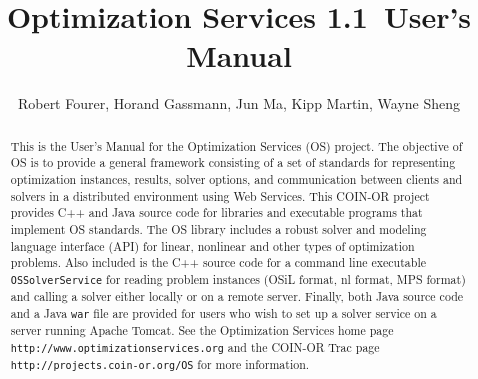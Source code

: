 \documentclass[11pt]{article}
\renewcommand{\_}{{\char"5F}}
\renewcommand{\{}{{\char"7B}}
\renewcommand{\}}{{\char"7D}}
\renewcommand{\^}{{\char"0D}}
\renewcommand{\'}{{\char"0D}}
\newcommand{\UrlOs}{http://www.optimizationservices.org}
\newcommand{\UrlTrac}{http://projects.coin-or.org/OS}
\newcommand{\OSstable}{1.1}
\begin{document}

\title{Optimization Services \OSstable\ User's Manual }
\vskip 2in
\author{Robert Fourer, Horand Gassmann, Jun Ma,  Kipp Martin, Wayne Sheng}
\maketitle

\begin{abstract}
This is the User's Manual for the Optimization Services (OS) project.  The objective of OS is to provide a
general framework consisting of a set of standards for representing optimization instances, results,
solver options, and communication between clients and solvers in a distributed environment using Web Services.
This COIN-OR project provides C++ and Java source code for libraries and executable programs that 
implement OS standards.   The OS library includes a robust solver and modeling language interface (API) for linear,
nonlinear and other types of optimization problems.   Also included is the C++ source code for a  command line
executable {\tt OSSolverService}  for reading problem instances 
(OSiL format, nl format, MPS format) and
calling a solver either locally or on a remote server.  Finally,  both Java source code and a Java {\tt war} 
file are provided for users who wish to set up a solver service on a server running Apache Tomcat.
See the Optimization Services home page {\tt\UrlOs} and the COIN-OR Trac page {\tt\UrlTrac} for 
more information.
\end{abstract}
\end{document}
